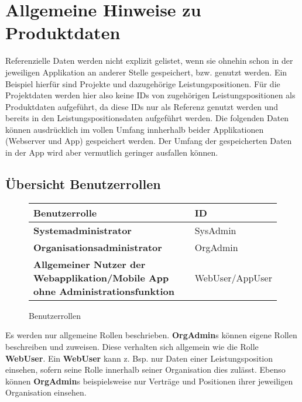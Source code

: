 \section{Allgemeine Hinweise zu Produktdaten}

Referenzielle Daten werden nicht explizit gelistet, wenn sie ohnehin schon in der jeweiligen Applikation an anderer Stelle gespeichert, bzw. genutzt werden.
Ein Beispiel hierfür sind Projekte und dazugehörige Leistungspositionen. Für die Projektdaten werden hier also keine IDs von zugehörigen Leistungspositionen
als Produktdaten aufgeführt, da diese IDs nur als Referenz genutzt werden und bereits in den Leistungspositionsdaten aufgeführt werden.
Die folgenden Daten können ausdrücklich im vollen Umfang innherhalb beider Applikationen (Webserver und App) gespeichert werden. Der Umfang der gespeicherten Daten in der App wird aber vermutlich geringer ausfallen können.

\subsection{Übersicht Benutzerrollen}

\begin{figure}[h]
	\centering
	\begin{tabularx}{\textwidth}{| X | X |}
        \hline
		\textbf{Benutzerrolle} & \textbf{ID} \\ \hline \hline
		\textbf{Systemadministrator} & SysAdmin \\ \hline
		\textbf{Organisationsadministrator} & OrgAdmin \\ \hline
        \textbf{Allgemeiner Nutzer der Webapplikation/Mobile App ohne Administrationsfunktion} & WebUser/AppUser \\ \hline
	\end{tabularx}
	\caption{Benutzerrollen}
	\label{fig:Benutzerrollen}
\end{figure}

\begin{flushleft}
Es werden nur allgemeine Rollen beschrieben. \textbf{OrgAdmin}s können eigene Rollen beschreiben und zuweisen. Diese verhalten sich allgemein wie die Rolle \textbf{WebUser}.
Ein \textbf{WebUser} kann z. Bsp. nur Daten einer Leistungsposition einsehen, sofern seine Rolle innerhalb seiner Organisation dies zulässt. Ebenso können \textbf{OrgAdmin}s beispielsweise nur Verträge und
Positionen ihrer jeweiligen Organisation einsehen.
\end{flushleft}

